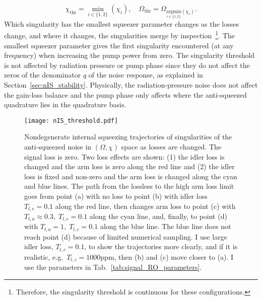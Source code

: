 \begin{equation}
\chi_\text{thr}=\min_{i\in\{1,2\}}(\chi_i),\quad\Omega_\text{thr}=\Omega_{\underset{i\in\{1,2\}}{\text{argmin}}(\chi_i)}.
\end{equation}
Which singularity has the smallest squeezer parameter changes as the losses change, and where it changes, the singularities merge by inspection~\footnote{Therefore, the singularity threshold is continuous for these configurations.}. The smallest squeezer parameter gives the first singularity encountered (at any frequency) when increasing the pump power from zero. %
The singularity threshold is not affected by radiation pressure or pump phase since they do not affect the zeros of the denominator $q$ of the noise response, as explained in Section~\ref{sec:nIS_stability}. Physically, the radiation-pressure noise does not affect the gain-loss balance and the pump phase only affects where the anti-squeezed quadrature lies in the quadrature basis.

\begin{figure}[ht]
    \centering
    \texttt{[image: nIS\_threshold.pdf]}
    \caption{Nondegenerate internal squeezing trajectories of singularities of the anti-squeezed noise in $(\Omega, \chi)$ space as losses are changed. The signal loss is zero. Two loss effects are shown: (1) the idler loss is changed and the arm loss is zero along the red line and (2) the idler loss is fixed and non-zero and the arm loss is changed along the cyan and blue lines. 
    The path from the lossless to the high arm loss limit goes from point (a) with no loss to point (b) with idler loss $T_{l,c}=0.1$ along the red line, then changes arm loss to point (c) with $T_{l,a}\approx0.3,\;T_{l,c}=0.1$ along the cyan line, and, finally, to point (d) with $T_{l,a}=1,\;T_{l,c}=0.1$ along the blue line. The blue line does not reach point (d) because of limited numerical sampling.
    I use large idler loss, $T_{l,c}=0.1$, to show the trajectories more clearly, and if it is realistic, e.g.\ $T_{l,c}=1000\text{ppm}$, then (b) and (c) move closer to (a). I use the parameters in Tab.~\ref{tab:signal_RO_parameters}.}
    \label{fig:nIS_threshold_traj}
\end{figure}

